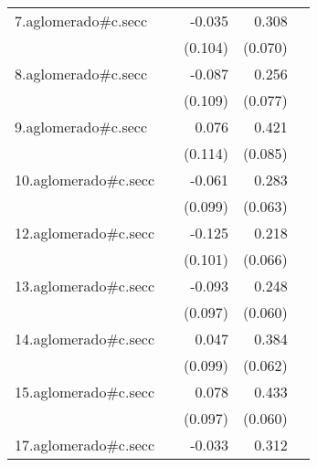 {\begin{longtable}{l*{4}{D{.}{.}{-1}}}
\addlinespace
7.aglomerado#c.secc&                     &      -0.035         &       0.308\sym{***}&                     \\
            &                     &     (0.104)         &     (0.070)         &                     \\
\addlinespace
8.aglomerado#c.secc&                     &      -0.087         &       0.256\sym{***}&                     \\
            &                     &     (0.109)         &     (0.077)         &                     \\
\addlinespace
9.aglomerado#c.secc&                     &       0.076         &       0.421\sym{***}&                     \\
            &                     &     (0.114)         &     (0.085)         &                     \\
\addlinespace
10.aglomerado#c.secc&                     &      -0.061         &       0.283\sym{***}&                     \\
            &                     &     (0.099)         &     (0.063)         &                     \\
\addlinespace
12.aglomerado#c.secc&                     &      -0.125         &       0.218\sym{***}&                     \\
            &                     &     (0.101)         &     (0.066)         &                     \\
\addlinespace
13.aglomerado#c.secc&                     &      -0.093         &       0.248\sym{***}&                     \\
            &                     &     (0.097)         &     (0.060)         &                     \\
\addlinespace
14.aglomerado#c.secc&                     &       0.047         &       0.384\sym{***}&                     \\
            &                     &     (0.099)         &     (0.062)         &                     \\
\addlinespace
15.aglomerado#c.secc&                     &       0.078         &       0.433\sym{***}&                     \\
            &                     &     (0.097)         &     (0.060)         &                     \\
\addlinespace
17.aglomerado#c.secc&                     &      -0.033         &       0.312\sym{***}&                     \\

\end{longtable}}
